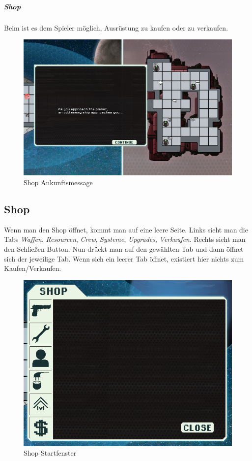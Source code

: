 \documentclass[fontsize=12pt,paper=a4,twoside]{scrartcl}
\begin{document}
\subparagraph{Shop}
 Beim  ist es dem Spieler möglich, Ausrüstung zu kaufen oder zu verkaufen.

\begin{figure}[H]
\centering
\includegraphics[width=1\linewidth]{DasSpiel/Karte/miniboss.png}
\caption{Shop Ankunftsmessage}
\end{figure}


\subsection{Shop}
\label{Shop}

Wenn man den Shop öffnet, kommt man auf eine leere Seite. Links sieht man die Tabs \textit{Waffen}, \textit{Resourcen}, \textit{Crew}, \textit{Systeme}, \textit{Upgrades}, \textit{Verkaufen}. Rechts sieht man den Schließen Button. Nun drückt man auf den gewählten Tab und dann öffnet sich der jeweilige Tab. Wenn sich ein leerer Tab öffnet, existiert hier nichts zum Kaufen/Verkaufen. 

\begin{figure}[H]
\centering
\includegraphics[width=1\linewidth]{DasSpiel/Shop/shop.png}
\caption{Shop Startfenster}
\end{figure}
\end{document}
